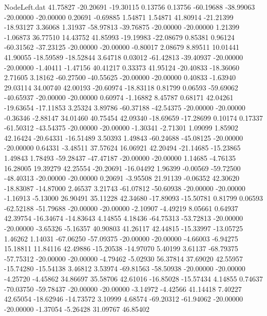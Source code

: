 \begin{filecontents}{NodeLeft.dat}
  41.75827  -20.20691  -19.30115     0.13756    0.13756  -60.19688  -38.99063  -20.00000  -20.00000    0.20691   -0.69885    1.54871    1.54871
  41.80914  -21.21399  -18.93127     3.36068    1.31937  -58.97813  -39.76875  -20.00000  -20.00000    1.21399   -1.06873   36.77510   14.43752
  41.85993  -19.19983  -22.08679     0.85381    0.96124  -60.31562  -37.23125  -20.00000  -20.00000   -0.80017    2.08679    8.89511   10.01441
  41.90055  -18.59589  -18.52844     3.64718    0.03012  -61.42813  -39.40937  -20.00000  -20.00000   -1.40411   -1.47156   40.41217    0.33373
  41.95124  -20.40833  -18.36060     2.71605    3.18162  -60.27500  -40.55625  -20.00000  -20.00000    0.40833   -1.63940   29.03114   34.00740
  42.00193  -20.60974  -18.83118     0.81799    0.06593  -59.69062  -40.65937  -20.00000  -20.00000    0.60974   -1.16882    8.45787    0.68171
  42.04261  -19.63654  -17.11853     3.25324    3.89786  -60.37188  -42.54375  -20.00000  -20.00000   -0.36346   -2.88147   34.01460   40.75454
  42.09340  -18.69659  -17.28699     0.10174    0.17337  -61.50312  -43.54375  -20.00000  -20.00000   -1.30341   -2.71301    1.09099    1.85902
  42.16424  -20.64331  -16.51489     3.50393    1.49843  -60.24688  -45.08125  -20.00000  -20.00000    0.64331   -3.48511   37.57624   16.06921
  42.20494  -21.14685  -15.23865     1.49843    1.78493  -59.28437  -47.47187  -20.00000  -20.00000    1.14685   -4.76135   16.28005   19.39279
  42.25554  -20.20691  -16.04492     1.96399   -0.00569  -59.72500  -48.40313  -20.00000  -20.00000    0.20691   -3.95508   21.91139   -0.06352
  42.30620  -18.83087  -14.87000     2.46537    3.21743  -61.07812  -50.60938  -20.00000  -20.00000   -1.16913   -5.13000   26.90491   35.11228
  42.34680  -17.89093  -15.50781     0.81799    0.06593  -62.52188  -51.79688  -20.00000  -20.00000   -2.10907   -4.49219    8.05661    0.64937
  42.39754  -16.34674  -14.83643     4.14855    4.18436  -64.75313  -53.72813  -20.00000  -20.00000   -3.65326   -5.16357   40.90803   41.26117
  42.44815  -15.33997  -13.05725     1.46262    1.14031  -67.06250  -57.09375  -20.00000  -20.00000   -4.66003   -6.94275   15.18811   11.84116
  42.49886  -15.20538  -14.97070     5.40199    3.61137  -68.79375  -57.75312  -20.00000  -20.00000   -4.79462   -5.02930   56.37814   37.69020
  42.55957  -15.74280  -15.54138     3.46812    3.53974  -69.81563  -58.50938  -20.00000  -20.00000   -4.25720   -4.45862   34.86697   35.58706
  42.61016  -16.85028  -15.57434     4.14855    0.74637  -70.03750  -59.78437  -20.00000  -20.00000   -3.14972   -4.42566   41.14418    7.40227
  42.65054  -18.62946  -14.73572     3.10999    4.68574  -69.20312  -61.94062  -20.00000  -20.00000   -1.37054   -5.26428   31.09767   46.85402

\end{filecontents}
